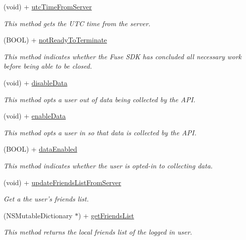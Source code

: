 \begin{DoxyCompactItemize}
(void) + \hyperlink{interface_fuse_s_d_k_a60de732b9ecb7bce2439517cc2ca1f71}{utc\+Time\+From\+Server}
\begin{DoxyCompactList}\small\item\em This method gets the U\+T\+C time from the server. \end{DoxyCompactList}\item 
(B\+O\+O\+L) + \hyperlink{interface_fuse_s_d_k_adb24897bb2dd5a7521d1f7c3cb6e0d4d}{not\+Ready\+To\+Terminate}
\begin{DoxyCompactList}\small\item\em This method indicates whether the Fuse S\+D\+K has concluded all necessary work before being able to be closed. \end{DoxyCompactList}\item 
(void) + \hyperlink{interface_fuse_s_d_k_a70b5812f76a70821e3d6de1ac9e44c04}{disable\+Data}
\begin{DoxyCompactList}\small\item\em This method opts a user out of data being collected by the A\+P\+I. \end{DoxyCompactList}\item 
(void) + \hyperlink{interface_fuse_s_d_k_a8c0d55b6f8fad28e9cb150271a82df2f}{enable\+Data}
\begin{DoxyCompactList}\small\item\em This method opts a user in so that data is collected by the A\+P\+I. \end{DoxyCompactList}\item 
(B\+O\+O\+L) + \hyperlink{interface_fuse_s_d_k_a0462d911d4b1aec0c9e4ff77f3acd6fa}{data\+Enabled}
\begin{DoxyCompactList}\small\item\em This method indicates whether the user is opted-\/in to collecting data. \end{DoxyCompactList}\item 
(void) + \hyperlink{interface_fuse_s_d_k_a11a92658dca5be9d79ca19a66bafb91e}{update\+Friends\+List\+From\+Server}
\begin{DoxyCompactList}\small\item\em Get a the user's friends list. \end{DoxyCompactList}\item 
(N\+S\+Mutable\+Dictionary $\ast$) + \hyperlink{interface_fuse_s_d_k_a31d609ce39be3e6eda04fd32d8036e95}{get\+Friends\+List}
\begin{DoxyCompactList}\small\item\em This method returns the local friends list of the logged in user. \end{DoxyCompactList}\item 

\end{DoxyCompactItemize}
